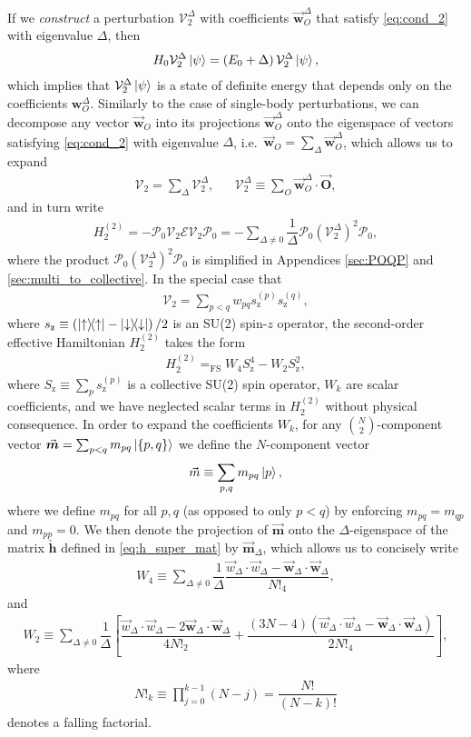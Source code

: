 \documentclass[nofootinbib,notitlepage,11pt]{revtex4-2}
\newcommand{\f}[2]{\dfrac{#1}{#2}} %
\newcommand{\p}[1]{\left(#1\right)} %
\renewcommand{\sp}[1]{\left[#1\right]} %
\renewcommand{\set}[1]{\left\{#1\right\}} %
\renewcommand{\c}{\cdot} %
\newcommand{\m}{\bm} %
\renewcommand{\v}{\vec} %
\newcommand{\1}{\mathds{1}}
\newcommand{\up}{\uparrow}
\newcommand{\dn}{\downarrow}
\newcommand{\z}{\text{z}}
\newcommand{\E}{\mathcal{E}}
\renewcommand{\P}{\mathcal{P}}
\newcommand{\V}{\mathcal{V}}
\newcommand{\EQFS}{=_{\text{FS}}}
\begin{document}
If we {\it construct} a perturbation $\V_2^\Delta$ with coefficients
$\v{\m w}_O^\Delta$ that satisfy \eqref{eq:cond_2} with eigenvalue
$\Delta$, then
\begin{align}
  H_0 \V_2^\Delta \ket\psi = \p{E_0 + \Delta} \V_2^\Delta \ket\psi,
\end{align}
which implies that $\V_2^\Delta\ket\psi$ is a state of definite energy
that depends only on the coefficients $\m w_O^\Delta$.  Similarly to
the case of single-body perturbations, we can decompose any vector
$\v{\m w}_O$ into its projections $\v{\m w}_O^\Delta$ onto the
eigenspace of vectors satisfying \eqref{eq:cond_2} with eigenvalue
$\Delta$, i.e.~$\v{\m w}_O=\sum_\Delta\v{\m w}_O^\Delta$, which allows
us to expand
\begin{align}
  \V_2 = \sum_\Delta \V_2^\Delta,
  &&
  \V_2^\Delta \equiv \sum_O \v{\m w}_O^\Delta \c \v{\m O},
\end{align}
and in turn write
\begin{align}
  H_2^{(2)} = - \P_0 \V_2 \E \V_2 \P_0
  = -\sum_{\Delta\ne0} \f1\Delta \P_0 \p{\V_2^\Delta}^2 \P_0,
\end{align}
where the product $\P_0 \p{\V_2^\Delta}^2 \P_0$ is simplified in
Appendices \ref{sec:POQP} and \ref{sec:multi_to_collective}.  In the
special case that
\begin{align}
  \V_2 = \sum_{p<q} w_{pq} s_\z^{(p)} s_\z^{(q)},
\end{align}
where $s_\z\equiv\p{\op\up-\op\dn}/2$ is an SU(2) spin-$z$ operator,
the second-order effective Hamiltonian $H_2^{(2)}$ takes the form
\begin{align}
  H_2^{(2)} \EQFS W_4 S_\z^4 - W_2 S_\z^2,
\end{align}
where $S_\z\equiv\sum_p s_\z^{(p)}$ is a collective SU(2) spin
operator, $W_k$ are scalar coefficients, and we have neglected scalar
terms in $H_2^{(2)}$ without physical consequence.  In order to expand
the coefficients $W_k$, for any ${N \choose 2}$-component vector
$\v{\m m}=\sum_{p<q}m_{pq}\ket{\set{p,q}}$ we define the $N$-component
vector
\begin{align}
  \v m \equiv \sum_{p,q} m_{pq} \ket{p},
\end{align}
where we define $m_{pq}$ for all $p,q$ (as opposed to only $p<q$) by
enforcing $m_{pq}=m_{qp}$ and $m_{pp}=0$.  We then denote the
projection of $\v{\m m}$ onto the $\Delta$-eigenspace of the matrix
$\check{\m h}$ defined in \eqref{eq:h_super_mat} by $\v{\m m}_\Delta$,
which allows us to concisely write
\begin{align}
  W_4
  \equiv \sum_{\Delta\ne0} \f1\Delta \f{\v w_\Delta\c\v w_\Delta
    - \v{\m w}_\Delta\c\v{\m w}_\Delta}{N!_4},
\end{align}
and
\begin{align}
  W_2
  \equiv \sum_{\Delta\ne0} \f1{\Delta} \sp{\f{\v w_\Delta\c\v w_\Delta
      - 2\v{\m w}_\Delta\c\v{\m w}_\Delta}{4N!_2}
    + \f{\p{3N-4}\p{\v w_\Delta\c\v w_\Delta
        - \v{\m w}_\Delta\c\v{\m w}_\Delta}}{2N!_4}},
\end{align}
where
\begin{align}
  N!_k \equiv \prod_{j=0}^{k-1} \p{N-j} = \f{N!}{\p{N-k}!}
\end{align}
denotes a falling factorial.
\end{document}
